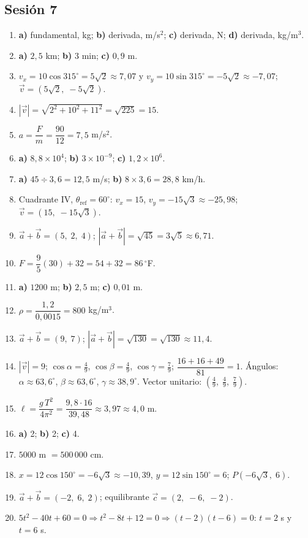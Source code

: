 \documentclass[12pt, letterpaper]{article}
\providecommand{\sen}{\sin}
\begin{document}
\subsection*{Sesión 7}
\begin{enumerate}[leftmargin=*, label=\textbf{\arabic*.}]
  \item \textbf{a)} fundamental, kg; \textbf{b)} derivada, m/s$^2$; \textbf{c)} derivada, N; \textbf{d)} derivada, kg/m$^3$.
  \item \textbf{a)} $2{,}5$ km; \textbf{b)} $3$ min; \textbf{c)} $0{,}9$ m.
  \item $v_x=10\cos 315^{\circ}=5\sqrt{2}\approx 7{,}07$ y $v_y=10\sen 315^{\circ}=-5\sqrt{2}\approx -7{,}07$; $\vec v=(5\sqrt{2},\; -5\sqrt{2})$.
  \item $|\vec v|=\sqrt{2^2+10^2+11^2}=\sqrt{225}=15$.
  \item $a=\dfrac{F}{m}=\dfrac{90}{12}=7{,}5$ m/s$^2$.
  \item \textbf{a)} $8{,}8 \times 10^{4}$; \textbf{b)} $3 \times 10^{-9}$; \textbf{c)} $1{,}2 \times 10^{6}$.
  \item \textbf{a)} $45 \div 3{,}6 = 12{,}5$ m/s; \quad \textbf{b)} $8 \times 3{,}6 = 28{,}8$ km/h.
  \item Cuadrante IV, $\theta_{\text{ref}}=60^{\circ}$: $v_x=15$, $v_y=-15\sqrt{3}\approx -25{,}98$; $\vec v=(15,\; -15\sqrt{3})$.
  \item $\vec a+\vec b=(5,\; 2,\; 4)$; $|\vec a+\vec b|=\sqrt{45}=3\sqrt{5}\approx 6{,}71$.
  \item $F=\dfrac{9}{5}(30)+32=54+32=86\,^{\circ}$F.
  \item \textbf{a)} $1200$ m; \textbf{b)} $2{,}5$ m; \textbf{c)} $0{,}01$ m.
  \item $\rho=\dfrac{1{,}2}{0{,}0015}=800$ kg/m$^3$.
  \item $\vec a+\vec b=(9,\; 7)$; $|\vec a+\vec b|=\sqrt{130}=\sqrt{130}\approx 11{,}4$.
  \item $|\vec v|=9$; $\cos\alpha=\frac{4}{9}$, $\cos\beta=\frac{4}{9}$, $\cos\gamma=\frac{7}{9}$; $\dfrac{16+16+49}{81}=1$. \checkmark\quad Ángulos: $\alpha\approx 63{,}6^{\circ}$, $\beta\approx 63{,}6^{\circ}$, $\gamma\approx 38{,}9^{\circ}$. Vector unitario: $(\frac{4}{9},\; \frac{4}{9},\; \frac{7}{9})$.
  \item $\ell=\dfrac{g\,T^2}{4\pi^2}=\dfrac{9{,}8\cdot 16}{39{,}48}\approx 3{,}97\approx 4{,}0$ m.
  \item \textbf{a)} 2; \quad \textbf{b)} 2; \quad \textbf{c)} 4.
  \item $5000$ m $=500\,000$ cm.
  \item $x=12\cos 150^{\circ}=-6\sqrt{3}\approx -10{,}39$, $y=12\sen 150^{\circ}=6$; $P(-6\sqrt{3},\; 6)$.
  \item $\vec a+\vec b=(-2,\; 6,\; 2)$; equilibrante $\vec c=(2,\; -6,\; -2)$.
  \item $5t^2-40t+60=0\Rightarrow t^2-8t+12=0\Rightarrow(t-2)(t-6)=0$: $t=2$ s y $t=6$ s.
\end{enumerate}
\end{document}
